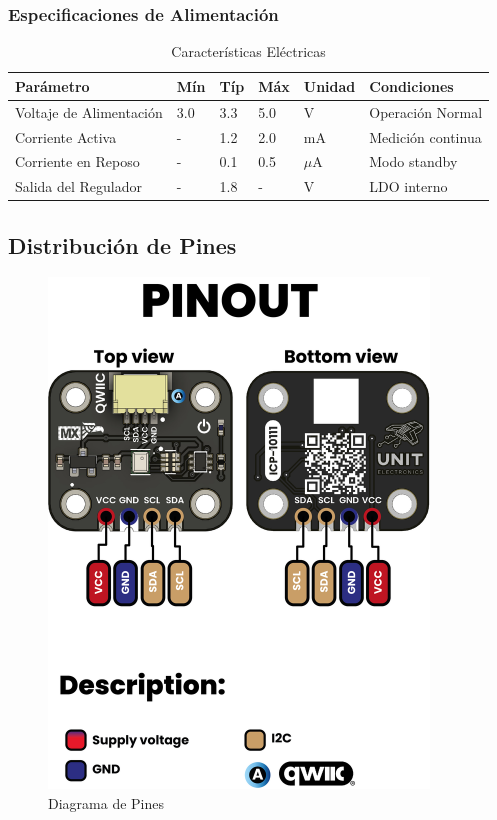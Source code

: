 \documentclass[11pt,a4paper]{article}
\begin{document}
\subsubsection{Especificaciones de Alimentación}


\begin{table}[H]
\centering
\small
\begin{tabular}{|l|l|l|l|l|l|}
\hline
Parámetro & Mín & Típ & Máx & Unidad & Condiciones \\
\hline
Voltaje de Alimentación & 3.0 & 3.3 & 5.0 & V & Operación Normal \\
Corriente Activa & - & 1.2 & 2.0 & mA & Medición continua \\
Corriente en Reposo & - & 0.1 & 0.5 & $\mu$A & Modo standby \\
Salida del Regulador & - & 1.8 & - & V & LDO interno \\
\hline
\end{tabular}
\caption{Características Eléctricas}
\end{table}


\subsection{Distribución de Pines}


\begin{figure}[H]
\centering
\includegraphics[width=0.9\textwidth]{es_unit_pinout_v_0_0_1_ue0094_icp10111_barometric_pressure_sensor_en.jpg}
\caption{Diagrama de Pines}
\label{fig:es-unit-pinout-v-0-0-1-ue0094-icp10111-barometric-pressure-sensor-en-jpg}
\end{figure}
\end{document}
